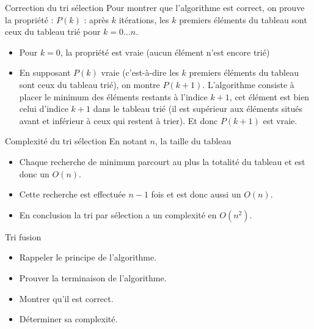 \documentclass[10pt]{beamer}
\begin{document}
\begin{frame}[fragile]{\Ctitle}{\stitle}
    \begin{exampleblock}{Correction du tri sélection}
        \textcolor{OliveGreen}{Pour montrer que l'algorithme est correct, on prouve  la propriété : $P(k)$ : \og{} après $k$ itérations, les $k$ premiers éléments du tableau sont ceux du tableau trié pour $k=0 \dots n$.}
        \begin{itemize}
            \item<2->\textcolor{OliveGreen}{Pour $k=0$, la propriété est vraie (aucun élément n'est encore trié)}
            \item<3->\textcolor{OliveGreen}{En supposant $P(k)$ vraie (c'est-à-dire les $k$ premiers éléments du tableau sont ceux du tableau trié), on montre $P(k+1)$. L'algorithme consiste à placer le minimum des éléments restants à l'indice $k+1$, cet élément est bien celui d'indice $k+1$ dans le tableau trié (il est supérieur aux éléments situés avant et inférieur à ceux qui restent à trier). Et donc $P(k+1)$ est vraie.}
        \end{itemize}
    \end{exampleblock}
\end{frame}

\begin{frame}[fragile]{\Ctitle}{\stitle}
    \begin{exampleblock}{Complexité du tri sélection}
        En notant $n$, la taille du tableau
        \begin{itemize}
            \item<1-> Chaque recherche de minimum parcourt au plus la totalité du tableau et est donc un $O(n)$.
            \item<2-> Cette recherche est effectuée $n-1$ fois et est donc aussi un $O(n)$.
            \item<3-> En conclusion la tri par sélection a un complexité en $O(n^2)$.
        \end{itemize}
    \end{exampleblock}
\end{frame}

\begin{frame}[fragile]{\Ctitle}{\stitle}
    \begin{exampleblock}{Tri fusion}
        \begin{itemize}
            \item<1-> Rappeler le principe de l'algorithme.
            \item<2-> Prouver la terminaison de l'algorithme.
            \item<3-> Montrer qu'il est correct.
            \item<4-> Déterminer sa complexité.
        \end{itemize}
    \end{exampleblock}
\end{frame}
\end{document}
